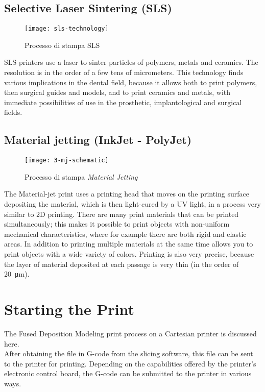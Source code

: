 \subsection{Selective Laser Sintering (SLS)}
\begin{wrapfigure} {R} {0.40\textwidth}
\vspace{-30pt}
	\begin{center}
	\texttt{[image: sls-technology]}
    \caption{Processo di stampa SLS}
    \label{fig:sls-technology}
    \end{center}
\vspace{-40pt}
\end{wrapfigure}
SLS printers use a laser to sinter particles of polymers, metals and ceramics. The resolution is in the order of a few tens of micrometers. This technology finds various implications in the dental field, because it allows both to print polymers, then surgical guides and models, and to print ceramics and metals, with immediate possibilities of use in the prosthetic, implantological and surgical fields.
\newpage
\subsection{Material jetting (InkJet - PolyJet)}
\begin{wrapfigure} {R} {0.5\textwidth}
\vspace{-20pt}
	\begin{center}
	\texttt{[image: 3-mj-schematic]}
    \caption{Processo di stampa \emph{Material Jetting}}
    \label{fig:3-mj-schematic}
    \end{center}
\vspace{-20pt}
\end{wrapfigure}
The Material-jet print uses a printing head that moves on the printing surface depositing the material, which is then light-cured by a UV light, in a process very similar to 2D printing.
There are many print materials that can be printed simultaneously; this makes it possible to print objects with non-uniform mechanical characteristics, where for example there are both rigid and elastic areas. In addition to printing multiple materials at the same time allows you to print objects with a wide variety of colors. Printing is also very precise, because the layer of material deposited at each passage is very thin (in the order of \SI{20}{\micro\metre}).

\section{Starting the Print}
The Fused Deposition Modeling print process on a Cartesian printer is discussed here. \\
After obtaining the file in G-code from the slicing software, this file can be sent to the printer for printing. Depending on the capabilities offered by the printer's electronic control board, the G-code can be submitted to the printer in various ways.


